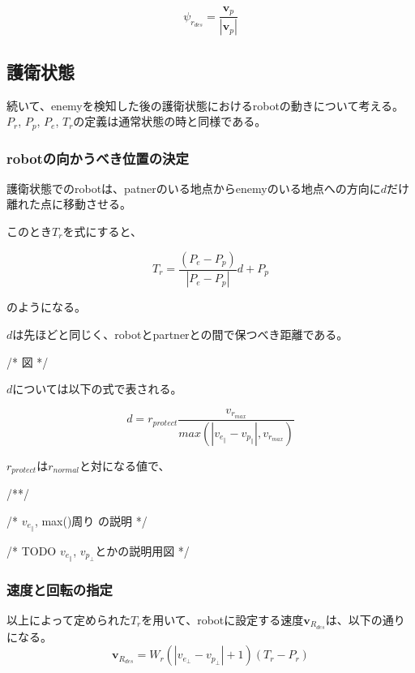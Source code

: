 \documentclass{kuisthesis}
\begin{document}
\begin{equation}
	\psi_r_{des} = \frac{\bm{v}_p}{|\bm{v}_p|} \nonumber
\end{equation}


\subsection{護衛状態}

続いて、enemyを検知した後の護衛状態におけるrobotの動きについて考える。
$P_r$, $P_p$, $P_e$, $T_r$の定義は通常状態の時と同様である。

\subsubsection*{robotの向かうべき位置の決定}

護衛状態でのrobotは、patnerのいる地点からenemyのいる地点への方向に$d$だけ離れた点に移動させる。

このとき$T_r$を式にすると、

\begin{equation}
T_r = \frac{(P_e - P_p)}{|P_e - P_p|}d + P_p \nonumber
\end{equation}

のようになる。

$d$は先ほどと同じく、robotとpartnerとの間で保つべき距離である。

/* 図 */

$d$については以下の式で表される。

\begin{equation}
d  = r_{protect} \frac{v_r_{max}}{max(|v_e_{\parallel} - v_p_{\parallel}|,v_r_{max})} \nonumber
\end{equation}

$r_{protect}$は$r_{normal}$と対になる値で、

/**/

/* $v_e_{\parallel}$, max()周り の説明 */

/* TODO $v_e_{\parallel}$, $v_p_{\perp}$とかの説明用図 */

\subsubsection*{速度と回転の指定}

以上によって定められた$T_r$を用いて、robotに設定する速度$\bm{v}_R_{des}$は、以下の通りになる。
\begin{equation}
	\bm{v}_R_{des} = W_r (|v_e_{\perp} - v_p_{\perp}|+1)(T_r - P_r) \nonumber
\end{equation}
\end{document}

